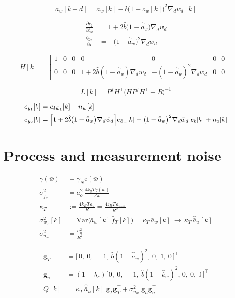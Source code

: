 \documentclass[11pt,a4paper,fontset=none]{ctexart}
\newcommand{\ba}{\bar{a}}
\newcommand{\bw}{\bar{w}}
\begin{document}
\begin{equation*}
\ba_w[k-d] = \ba_w[k]
  - b\bigl(1-\ba_w[k]\bigr)^{2}\nabla_d\bw_d[k]
\end{equation*}

\begin{align*}
\frac{\partial y_2}{\partial \ba_w}
  &= 1 + 2\hat{b}\bigl(1-\hat{\ba}_w\bigr)\nabla_d\bw_d \\
\frac{\partial y_2}{\partial b}
  &= -\bigl(1-\hat{\ba}_w\bigr)^{2}\nabla_d\bw_d
\end{align*}

\begin{equation*}
H[k] =
\begin{bmatrix}
1 & 0 & 0 & 0 & 0 & 0 & 0 \\
0 & 0 & 0 & 1 + 2\hat{b}(1-\hat{\ba}_w)\nabla_d\bw_d
  & -(1-\hat{\ba}_w)^{2}\nabla_d\bw_d & 0 & 0
\end{bmatrix}
\end{equation*}

\begin{equation*}
L[k] = P^f H^{\top}\bigl(HP^fH^{\top}+R\bigr)^{-1}
\end{equation*}

\begin{align*}
e_{y_1}[k] &= e_{\delta\bw_1}[k] + n_w[k] \\
e_{y_2}[k] &= \Bigl[1 + 2\hat{b}\bigl(1-\hat{\ba}_w\bigr)
    \nabla_d\bw_d\Bigr] e_{\ba_w}[k]
  - \bigl(1-\hat{\ba}_w\bigr)^{2}\nabla_d\bw_d\;e_b[k]
  + n_a[k]
\end{align*}

\section{Process and measurement noise}

\begin{align*}
\gamma(\bw) &= \gamma_N c(\bw) \\
\sigma^{2}_{\bar{f}_T} &= a_o^{2}\,\frac{4k_BT\gamma(\bw)}{\Delta t} \\
\kappa_T &:= \frac{4k_BT\,a_o}{R} = \frac{4k_BT\,a_{\mathrm{nom}}}{R^{2}} \\
\sigma^{2}_{w_T}[k] &= \mathrm{Var}\bigl(\ba_w[k]\,\bar{f}_T[k]\bigr)
  = \kappa_T\,\ba_w[k] \ \to\ \kappa_T\,\hat{\ba}_w[k] \\
\sigma^{2}_{n_w} &= \frac{\sigma^{2}_{n}}{R^{2}}
\end{align*}

\begin{align*}
\mathbf{g}_T &= \bigl[\,0,\ 0,\ -1,\ \hat{b}(1-\hat{\ba}_w)^{2},\ 0,\ 1,\ 0\,\bigr]^{\top} \\
\mathbf{g}_n &= (1-\lambda_c)\bigl[\,0,\ 0,\ -1,\ \hat{b}(1-\hat{\ba}_w)^{2},\ 0,\ 0,\ 0\,\bigr]^{\top} \\
Q[k] &= \kappa_T\,\hat{\ba}_w[k]\;\mathbf{g}_T\mathbf{g}_T^{\top}
  + \sigma^{2}_{n_w}\;\mathbf{g}_n\mathbf{g}_n^{\top}
\end{align*}
\end{document}
